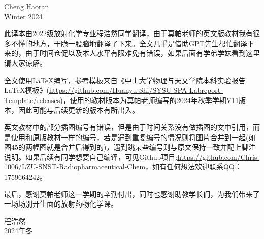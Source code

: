 \documentclass[dvipsnames, svgnames,a4paper,11pt]{article}
\begin{document}
\begin{flushright}

    Cheng Haoran \\
    Winter 2024
    
\end{flushright}

此译本由2022级放射化学专业程浩然同学翻译，由于莫帕老师的英文版教材我有很多不懂的地方，干脆一股脑地翻译了下来。全文几乎是借助GPT先生帮忙翻译下来的，由于时间仓促以及本人水平有限难免有错误，如果后面有学弟学妹看到这里请大家谅解。

全文使用\LaTeX 编写，参考模板来自《中山大学物理与天文学院本科实验报告LaTeX模板》(\url{https://github.com/Huanyu-Shi/SYSU-SPA-Labreport-Template/releases})，使用的教材版本为莫帕老师编写的2024年秋季学期V11版本，因此可能与后续更新的版本有所出入。

英文教材中的部分插图编号有错误，但是由于时间关系没有做插图的文中引用，而是使用和原版教材一样的编号，若是遇到重复编号的情况则将图片合并到一起(如图45的两幅图就是合并后得到的)，遇到跳某些编号则与原文保持一致并配上脚注说明。如果后续有同学想要自己编译，可见Github项目:\url{https://github.com/Chris-1006/LZU-SNST-Radiopharmaceutical-Chem}，如有任何想法欢迎联系QQ：1759664242。

最后，感谢莫帕老师这一学期的辛勤付出，同时也感谢助教学长们，为我们带来了一场场别开生面的放射药物化学课。

\begin{flushright}

程浩然\\
2024年冬

\end{flushright}
\end{document}
